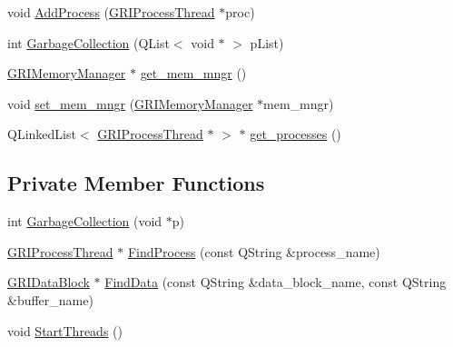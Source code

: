 \begin{DoxyCompactItemize}
void \hyperlink{classGRIRegulator_ac70577111abf5a102642787efe945615}{\-Add\-Process} (\hyperlink{classGRIProcessThread}{\-G\-R\-I\-Process\-Thread} $\ast$proc)
\item 
int \hyperlink{classGRIRegulator_ad9e75ac4b7dda64abd8620116b09367f}{\-Garbage\-Collection} (\-Q\-List$<$ void $\ast$ $>$ p\-List)
\item 
\hyperlink{classGRIMemoryManager}{\-G\-R\-I\-Memory\-Manager} $\ast$ \hyperlink{classGRIRegulator_a6e4c8db5a7b22e5f7a4f2851f2042c68}{get\-\_\-mem\-\_\-mngr} ()
\item 
void \hyperlink{classGRIRegulator_a9809eb7c5f4286041a448bb77b343b0a}{set\-\_\-mem\-\_\-mngr} (\hyperlink{classGRIMemoryManager}{\-G\-R\-I\-Memory\-Manager} $\ast$mem\-\_\-mngr)
\item 
\-Q\-Linked\-List$<$ \hyperlink{classGRIProcessThread}{\-G\-R\-I\-Process\-Thread} $\ast$ $>$ $\ast$ \hyperlink{classGRIRegulator_a06bd9d1013d5e8fc4fa757d166d69b31}{get\-\_\-processes} ()
\end{DoxyCompactItemize}
\subsection*{\-Private \-Member \-Functions}
\begin{DoxyCompactItemize}
\item 
int \hyperlink{classGRIRegulator_a1b086f33a28240cd4fc7254e5880165c}{\-Garbage\-Collection} (void $\ast$p)
\item 
\hyperlink{classGRIProcessThread}{\-G\-R\-I\-Process\-Thread} $\ast$ \hyperlink{classGRIRegulator_a06925e80c5b9b432a7273b6230e4ea33}{\-Find\-Process} (const \-Q\-String \&process\-\_\-name)
\item 
\hyperlink{classGRIDataBlock}{\-G\-R\-I\-Data\-Block} $\ast$ \hyperlink{classGRIRegulator_a5a6069c5569e928dc10bb125e5729f37}{\-Find\-Data} (const \-Q\-String \&data\-\_\-block\-\_\-name, const \-Q\-String \&buffer\-\_\-name)
\item 
void \hyperlink{classGRIRegulator_a1d6ba3a87019cf4cb199f2e853e42dac}{\-Start\-Threads} ()
\end{DoxyCompactItemize}
